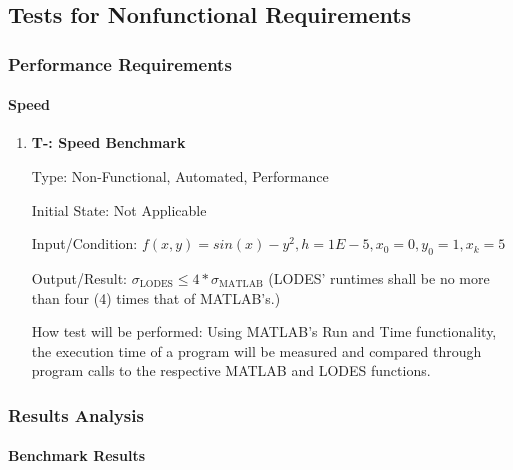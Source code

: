 \documentclass[12pt, titlepage]{article}
\newcounter{tnum} %
\newcommand{\famname}{LODES} %
\begin{document}
%

\subsection{Tests for Nonfunctional Requirements}

\subsubsection{Performance Requirements}
		
\paragraph{Speed}

\begin{enumerate}

\item{\textbf{T-\thetnum \label{t-speed}: Speed Benchmark}}

Type: Non-Functional, Automated, Performance 
					
Initial State: Not Applicable
					
Input/Condition: $f(x, y) = sin(x) - y^2, h = 1E-5, x_0 = 0, y_0 = 1, x_k = 5$
					
Output/Result: $\sigma_\text{\famname{}} \leq 4*\sigma_\text{MATLAB}$ (\famname{}' runtimes shall be no more 
than four (4) times that of MATLAB's.)
					
How test will be performed: Using MATLAB's Run and Time functionality, the execution time of a program will be 
measured and compared through program calls to the respective MATLAB and \famname{} functions.\

\end{enumerate}

\subsubsection{Results Analysis}

\paragraph{Benchmark Results}
\end{document}
